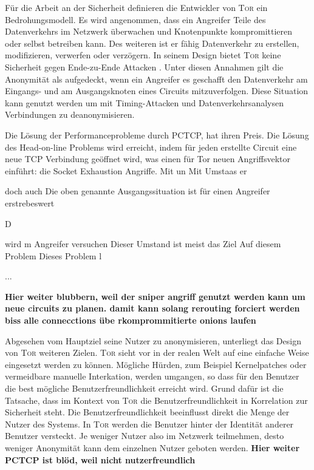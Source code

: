 \documentclass[fleqn,envcountsame,runningheads,10pt,a4paper]{llncs}
\begin{document}
Für die Arbeit an der Sicherheit definieren die Entwickler von \textsc{Tor} ein Bedrohungsmodell. Es wird angenommen, dass ein Angreifer Teile des Datenverkehrs im Netzwerk überwachen und Knotenpunkte kompromittieren oder selbst betreiben kann. Des weiteren ist er fähig Datenverkehr zu erstellen, modifizieren, verwerfen oder verzögern. In seinem Design bietet \textsc{Tor} keine Sicherheit gegen Ende-zu-Ende Attacken \cite{tor}. Unter diesen Annahmen gilt die Anonymität als aufgedeckt, wenn ein Angreifer es geschafft den Datenverkehr am Eingangs- und am Ausgangsknoten eines Circuits mitzuverfolgen. Diese Situation kann genutzt werden um mit Timing-Attacken und Datenverkehrsanalysen Verbindungen zu deanonymisieren.

Die Lösung der Performanceprobleme durch PCTCP, hat ihren Preis. Die Lösung des Head-on-line Problems wird erreicht, indem für jeden erstellte Circuit eine neue TCP Verbindung geöffnet wird, was einen für Tor neuen Angriffsvektor einführt: die Socket Exhaustion Angriffe. Mit un Mit    Umstaas er

doch auch Die oben genannte Ausgangssituation ist für einen Angreifer erstrebeswert


D

wird m Angreifer versuchen Dieser Umstand ist meist das Ziel Auf diesem Problem Dieses Problem l



...


\textbf{Hier weiter blubbern, weil der sniper angriff genutzt werden kann um neue circuits zu planen. damit kann solang rerouting forciert werden biss alle connecctions übe rkomprommitierte onions laufen}


Abgesehen vom Hauptziel seine Nutzer zu anonymisieren, unterliegt das Design von \textsc{Tor} weiteren Zielen. \textsc{Tor} sieht vor in der realen Welt auf eine einfache Weise eingesetzt werden zu können. Mögliche Hürden, zum Beispiel Kernelpatches oder vermeidbare manuelle Interkation, werden umgangen, so dass für den Benutzer die best mögliche Benutzerfreundlichkeit erreicht wird. Grund dafür ist die Tatsache, dass im Kontext von \textsc{Tor} die Benutzerfreundlichkeit in Korrelation zur Sicherheit steht. Die Benutzerfreundlichkeit beeinflusst direkt die Menge der Nutzer des Systems. In \textsc{Tor} werden die Benutzer hinter der Identität anderer Benutzer versteckt. Je weniger Nutzer also im Netzwerk teilmehmen, desto weniger Anonymität kann dem einzelnen Nutzer geboten werden. \textbf{Hier weiter PCTCP ist blöd, weil nicht nutzerfreundlich}
\end{document}
